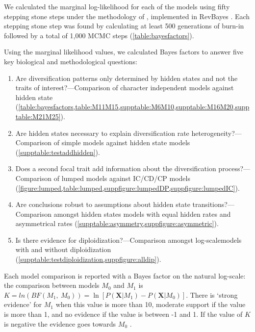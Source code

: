 We calculated the marginal log-likelihood for each of the models using fifty stepping stone steps under the methodology of \citet{xie_2010}, implemented in RevBayes \citep{hoehna_2016}.
Each stepping stone step was found by calculating at least 500 generations of burn-in followed by a total of 1,000 MCMC steps (\cref{table:bayesfactors}).

Using the marginal likelihood values, we calculated Bayes factors to answer five key biological and methodological questions:
\begin{enumerate}
\item Are diversification patterns only determined by hidden states and not the traits of interest?---Comparison of character independent models against hidden state (\cref{table:bayesfactors,table:M11M15,supptable:M6M10,supptable:M16M20,supptable:M21M25}).
\item Are hidden states necessary to explain diversification rate heterogeneity?---Comparison of simple models against hidden state models (\cref{supptable:testaddhidden}).
\item Does a second focal trait add information about the diversification process?---Comparison of lumped models against IC/CD/CP models (\cref{figure:lumped,table:lumped,suppfigure:lumpedDP,suppfigure:lumpedIC}).
\item Are conclusions robust to assumptions about hidden state transitions?---Comparison amongst hidden states models with equal hidden rates and asymmetrical rates (\cref{supptable:asymmetry,suppfigure:asymmetric}).
\item Is there evidence for diploidization?---Comparison amongst log-scalemodels with and without diploidization (\cref{supptable:testdiploidization,suppfigure:alldip}).
\end{enumerate}

Each model comparison is reported with a Bayes factor on the natural log-scale: the comparison between models $M_0$ and $M_1$ is $K=ln(BF(M_1,\ M_0)) = \ln[ P(\mathbf{X} | M_1) - P(\mathbf{X} | M_0)]$.
There is `strong evidence' for $M_1$ when this value is more than 10, moderate support if the value is more than 1, and no evidence if the value is between -1 and 1.
If the value of $K$ is negative the evidence goes towards $M_0$ \citep{kass1995}.


